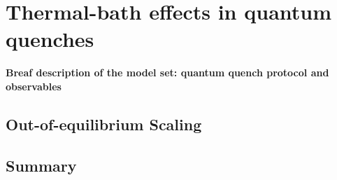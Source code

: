\section{Thermal-bath effects in quantum quenches}

{\bf Breaf description of the model set: quantum quench protocol and observables}

\subsection{Out-of-equilibrium Scaling}


\subsection{Summary}
